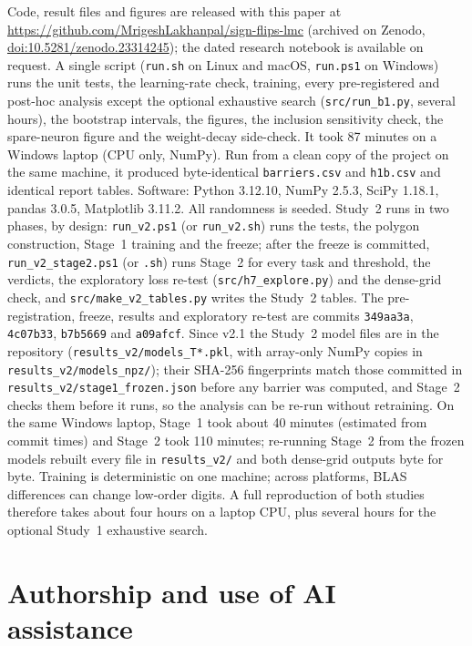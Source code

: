 \documentclass[11pt]{article}
\begin{document}
Code, result files and figures are released with this paper at \url{https://github.com/MrigeshLakhanpal/sign-flips-lmc} (archived on Zenodo, \href{https://doi.org/10.5281/zenodo.23314245}{doi:10.5281/zenodo.23314245}); the dated research notebook is available on request. A single script (\texttt{run.sh} on Linux and macOS, \texttt{run.ps1} on Windows) runs the unit tests, the learning-rate check, training, every pre-registered and post-hoc analysis except the optional exhaustive search (\texttt{src/run\_b1.py}, several hours), the bootstrap intervals, the figures, the inclusion sensitivity check, the spare-neuron figure and the weight-decay side-check. It took 87 minutes on a Windows laptop (CPU only, NumPy). Run from a clean copy of the project on the same machine, it produced byte-identical \texttt{barriers.csv} and \texttt{h1b.csv} and identical report tables. Software: Python 3.12.10, NumPy 2.5.3, SciPy 1.18.1, pandas 3.0.5, Matplotlib 3.11.2. All randomness is seeded. Study~2 runs in two phases, by design: \texttt{run\_v2.ps1} (or \texttt{run\_v2.sh}) runs the tests, the polygon construction, Stage~1 training and the freeze; after the freeze is committed, \texttt{run\_v2\_stage2.ps1} (or \texttt{.sh}) runs Stage~2 for every task and threshold, the verdicts, the exploratory loss re-test (\texttt{src/h7\_explore.py}) and the dense-grid check, and \texttt{src/make\_v2\_tables.py} writes the Study~2 tables. The pre-registration, freeze, results and exploratory re-test are commits \texttt{349aa3a}, \texttt{4c07b33}, \texttt{b7b5669} and \texttt{a09afcf}. Since v2.1 the Study~2 model files are in the repository (\texttt{results\_v2/models\_T*.pkl}, with array-only NumPy copies in \texttt{results\_v2/models\_npz/}); their SHA-256 fingerprints match those committed in \texttt{results\_v2/stage1\_frozen.json} before any barrier was computed, and Stage~2 checks them before it runs, so the analysis can be re-run without retraining. On the same Windows laptop, Stage~1 took about 40 minutes (estimated from commit times) and Stage~2 took 110 minutes; re-running Stage~2 from the frozen models rebuilt every file in \texttt{results\_v2/} and both dense-grid outputs byte for byte. Training is deterministic on one machine; across platforms, BLAS differences can change low-order digits. A full reproduction of both studies therefore takes about four hours on a laptop CPU, plus several hours for the optional Study~1 exhaustive search.

\section*{Authorship and use of AI assistance}
\end{document}
